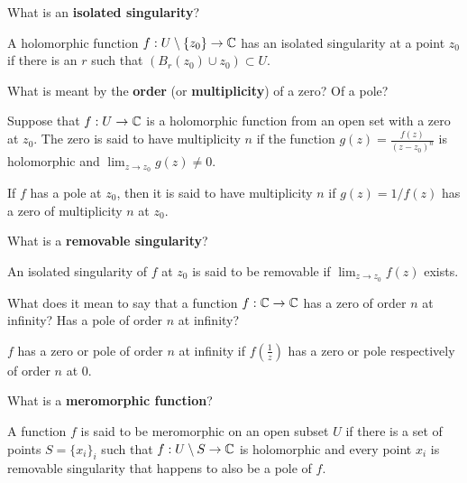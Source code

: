 \documentclass{homework}
\begin{document}
\begin{problem}
  What is an \textbf{isolated singularity}?
  \end{problem}
  \begin{solution}
  A holomorphic function $f:U\setminus \{z_0\}\to\mathbb{C}$ has an isolated singularity at a point $z_0$ if there is an $r$ such that $(B_r(z_0)\cup z_0) \subset U$.
  \end{solution}
  \begin{problem}
    What is meant by the \textbf{order} (or \textbf{multiplicity}) of a zero?  Of a pole?
    \end{problem}
    \begin{solution}
    Suppose that $f:U\to \mathbb{C}$ is a  holomorphic function from an open set with a zero at $z_0$. The zero is said to have multiplicity $n$ if the function $g(z) = \frac{f(z)}{(z-z_0)^n}$ is holomorphic and $\lim_{z\to z_0} g(z) \neq 0$.

    If $f$ has a pole at $z_0$, then it is said to have multiplicity $n$ if $g(z) = 1/f(z)$ has a zero of multiplicity $n$ at $z_0$.
    \end{solution}
    \begin{problem}
      What is a \textbf{removable singularity}?
      \end{problem}
      \begin{solution}
      An isolated singularity of $f$ at $z_0$ is said to be removable if $\lim_{z\to z_0} f(z)$ exists.
      \end{solution}
      \begin{problem}
        What does it mean to say that a function $f : \mathbb{C} \to \mathbb{C}$ has a zero of order $n$ at infinity?  Has a pole of order $n$ at infinity?  
        \end{problem}
        \begin{solution}
        $f$ has a zero or pole of order $n$ at infinity if $f(\frac{1}{z})$ has a zero or pole respectively of order $n$ at 0. 
        \end{solution}
        \begin{problem}
        What is a \textbf{meromorphic function}?
        \end{problem}
        \begin{solution}
        A function $f$ is said to be meromorphic on an open subset $U$ if there is a set of points $S = \{x_i\}_i$ such that $f:U\setminus S\to \mathbb{C}$ is holomorphic and every point $x_i$ is removable singularity that happens to also be a pole of $f$.
        \end{solution}
\end{document}
